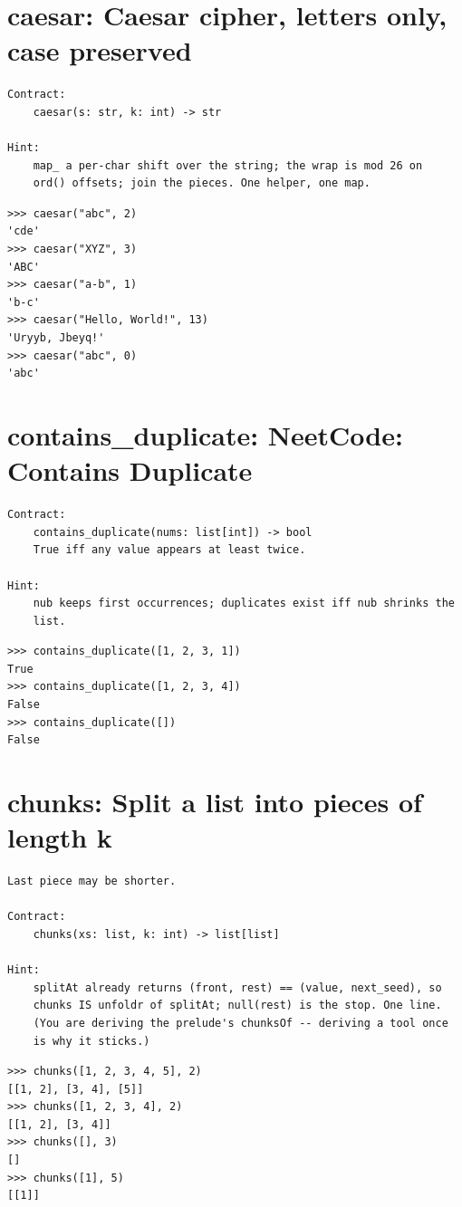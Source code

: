 \documentclass[10pt,letterpaper]{book}
\begin{document}
\section{caesar: Caesar cipher, letters only, case preserved}
\begin{lstlisting}[style=ex]
Contract:
    caesar(s: str, k: int) -> str

Hint:
    map_ a per-char shift over the string; the wrap is mod 26 on
    ord() offsets; join the pieces. One helper, one map.
\end{lstlisting}
\begin{lstlisting}[style=ex]
>>> caesar("abc", 2)
'cde'
>>> caesar("XYZ", 3)
'ABC'
>>> caesar("a-b", 1)
'b-c'
>>> caesar("Hello, World!", 13)
'Uryyb, Jbeyq!'
>>> caesar("abc", 0)
'abc'
\end{lstlisting}

\section{contains\_duplicate: NeetCode: Contains Duplicate}
\begin{lstlisting}[style=ex]
Contract:
    contains_duplicate(nums: list[int]) -> bool
    True iff any value appears at least twice.

Hint:
    nub keeps first occurrences; duplicates exist iff nub shrinks the
    list.
\end{lstlisting}
\begin{lstlisting}[style=ex]
>>> contains_duplicate([1, 2, 3, 1])
True
>>> contains_duplicate([1, 2, 3, 4])
False
>>> contains_duplicate([])
False
\end{lstlisting}

\section{chunks: Split a list into pieces of length k}
\begin{lstlisting}[style=ex]
Last piece may be shorter.

Contract:
    chunks(xs: list, k: int) -> list[list]

Hint:
    splitAt already returns (front, rest) == (value, next_seed), so
    chunks IS unfoldr of splitAt; null(rest) is the stop. One line.
    (You are deriving the prelude's chunksOf -- deriving a tool once
    is why it sticks.)
\end{lstlisting}
\begin{lstlisting}[style=ex]
>>> chunks([1, 2, 3, 4, 5], 2)
[[1, 2], [3, 4], [5]]
>>> chunks([1, 2, 3, 4], 2)
[[1, 2], [3, 4]]
>>> chunks([], 3)
[]
>>> chunks([1], 5)
[[1]]
\end{lstlisting}
\end{document}
